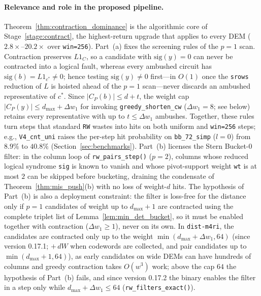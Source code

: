 \documentclass[12pt]{article}
\theoremstyle{definition}
\newcommand{\ttt}[1]{\texttt{#1}}
\begin{document}
\paragraph{Relevance and role in the proposed pipeline.}
Theorem~\ref{thm:contraction_dominance} is the algorithmic core of Stage~\ref{stage:contract}, the highest-return
upgrade that applies to every DEM ($2.8\times$--$20.2\times$ over \ttt{win=256}). Part~(a) fixes the screening rules
of the $p = 1$ scan. Contraction preserves $L 1_C$, so a candidate with $\mathrm{sig}(y) = 0$ can never be contracted
into a logical fault, whereas every ambushed circuit has $\mathrm{sig}(b) = L 1_{c^*} \neq 0$; hence testing
$\mathrm{sig}(y) \neq 0$ first---in $O(1)$ once the \ttt{srows} reduction of $L$ is hoisted ahead of the $p = 1$
scan---never discards an ambushed representative of $c^*$. Since $|C_P(b)| \le d + t$, the weight cap $|C_P(y)| \le
d_{\max} + \Delta w_1$ for invoking \ttt{greedy\_shorten\_cw} ($\Delta w_1 = 8$; see below) retains every
representative with up to $t \le \Delta w_1$ ambushes. Together, these rules turn steps that standard \ttt{RW} wastes
into hits on both uniform and \ttt{win=256} steps; e.g., \ttt{V4\_cnt\_uni} raises the per-step hit probability on
\ttt{bb\_72\_simp} ($l = 0$) from $8.9\%$ to $40.8\%$ (Section~\ref{sec:benchmarks}). Part~(b) licenses the Stern
Bucket-0 filter: in the column loop of \ttt{rw\_pairs\_step()} ($p = 2$), columns whose reduced logical syndrome
\ttt{sig} is known to vanish and whose pivot-support weight \ttt{wt} is at most $2$ can be skipped before bucketing,
draining the condensate of Theorem~\ref{thm:mis_push}(b) with no loss of weight-$d$ hits. The hypothesis of Part~(b)
is also a deployment constraint: the filter is loss-free for the distance only if $p = 1$ candidates of weight up to
$d_{\max} + 1$ are contracted using the complete triplet list of Lemma~\ref{lem:min_det_bucket}, so it must be enabled
together with contraction ($\Delta w_1 \ge 1$), never on its own. In \ttt{dist-m4ri}, the candidates are contracted
only up to the weight $\min(d_{\max} + \Delta w_1, 64)$ (since version 0.17.1; $+\,dW$ when codewords are collected,
and pair candidates up to $\min(d_{\max} + 1, 64)$), as early candidates on wide DEMs can have hundreds of columns and
greedy contraction takes $O(w^3)$ work; above the cap $64$ the hypothesis of Part~(b) fails, and since version 0.17.2
the binary enables the filter in a step only while $d_{\max} + \Delta w_1 \le 64$ (\ttt{rw\_filters\_exact()}).
\end{document}
